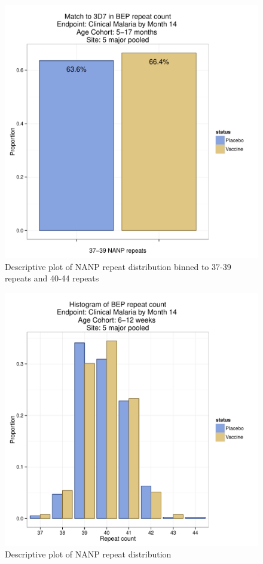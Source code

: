 \documentclass[]{article}
\begin{document}
\begin{figure}[htbp]
\centering
\includegraphics{figures/bep-cat-infact-c-1.pdf}
\caption{Descriptive plot of NANP repeat distribution binned to 37-39
repeats and 40-44 repeats}
\end{figure}

\begin{figure}[htbp]
\centering
\includegraphics{figures/bep-hist-newborn-c-1.pdf}
\caption{Descriptive plot of NANP repeat distribution}
\end{figure}
\end{document}
